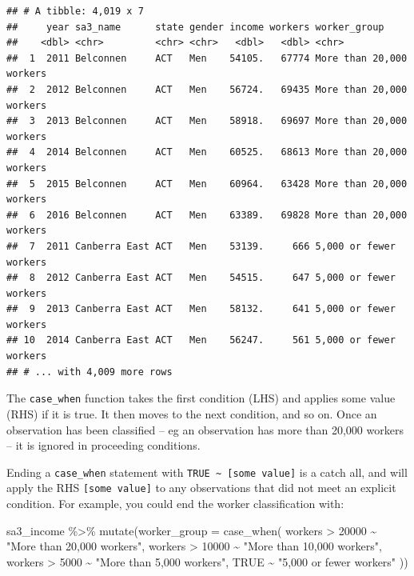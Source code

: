 \documentclass[
]{book}
\newenvironment{Shaded}{\begin{snugshade}}{\end{snugshade}}
\newcommand{\AttributeTok}[1]{\textcolor[rgb]{0.77,0.63,0.00}{#1}}
\newcommand{\ConstantTok}[1]{\textcolor[rgb]{0.00,0.00,0.00}{#1}}
\newcommand{\DecValTok}[1]{\textcolor[rgb]{0.00,0.00,0.81}{#1}}
\newcommand{\FunctionTok}[1]{\textcolor[rgb]{0.00,0.00,0.00}{#1}}
\newcommand{\NormalTok}[1]{#1}
\newcommand{\SpecialCharTok}[1]{\textcolor[rgb]{0.00,0.00,0.00}{#1}}
\newcommand{\StringTok}[1]{\textcolor[rgb]{0.31,0.60,0.02}{#1}}
\begin{document}
\begin{verbatim}
## # A tibble: 4,019 x 7
##     year sa3_name      state gender income workers worker_group            
##    <dbl> <chr>         <chr> <chr>   <dbl>   <dbl> <chr>                   
##  1  2011 Belconnen     ACT   Men    54105.   67774 More than 20,000 workers
##  2  2012 Belconnen     ACT   Men    56724.   69435 More than 20,000 workers
##  3  2013 Belconnen     ACT   Men    58918.   69697 More than 20,000 workers
##  4  2014 Belconnen     ACT   Men    60525.   68613 More than 20,000 workers
##  5  2015 Belconnen     ACT   Men    60964.   63428 More than 20,000 workers
##  6  2016 Belconnen     ACT   Men    63389.   69828 More than 20,000 workers
##  7  2011 Canberra East ACT   Men    53139.     666 5,000 or fewer workers  
##  8  2012 Canberra East ACT   Men    54515.     647 5,000 or fewer workers  
##  9  2013 Canberra East ACT   Men    58132.     641 5,000 or fewer workers  
## 10  2014 Canberra East ACT   Men    56247.     561 5,000 or fewer workers  
## # ... with 4,009 more rows
\end{verbatim}

The \texttt{case\_when} function takes the first condition (LHS) and applies some value (RHS) if it is true. It then moves to the next condition, and so on. Once an observation has been classified -- eg an observation has more than 20,000 workers -- it is ignored in proceeding conditions.

Ending a \texttt{case\_when} statement with \texttt{TRUE\ \textasciitilde{}\ {[}some\ value{]}} is a catch all, and will apply the RHS \texttt{{[}some\ value{]}} to any observations that did not meet an explicit condition. For example, you could end the worker classification with:

\begin{Shaded}
\begin{Highlighting}[]
\NormalTok{sa3\_income }\SpecialCharTok{\%\textgreater{}\%} 
  \FunctionTok{mutate}\NormalTok{(}\AttributeTok{worker\_group =} \FunctionTok{case\_when}\NormalTok{(}
\NormalTok{    workers }\SpecialCharTok{\textgreater{}} \DecValTok{20000} \SpecialCharTok{\textasciitilde{}} \StringTok{"More than 20,000 workers"}\NormalTok{,}
\NormalTok{    workers }\SpecialCharTok{\textgreater{}} \DecValTok{10000} \SpecialCharTok{\textasciitilde{}} \StringTok{"More than 10,000 workers"}\NormalTok{,}
\NormalTok{    workers }\SpecialCharTok{\textgreater{}}  \DecValTok{5000} \SpecialCharTok{\textasciitilde{}} \StringTok{"More than 5,000 workers"}\NormalTok{,}
    \ConstantTok{TRUE} \SpecialCharTok{\textasciitilde{}} \StringTok{"5,000 or fewer workers"}
\NormalTok{  ))}
\end{Highlighting}
\end{Shaded}
\end{document}
